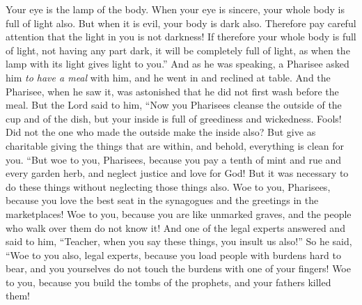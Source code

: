 \begin{biblechapter}
\verse Your eye is the lamp of the body. When your eye is sincere, your whole body is full of light also. But when it is evil, your body is dark also.
\verse Therefore pay careful attention that the light in you is not darkness!
\verse If therefore your whole body is full of light, not having any part dark, it will be completely full of light, as when the lamp with its light gives light to you.”
 And as he was speaking, a Pharisee asked him \textit{to have a meal} with him, and he went in and reclined at table.
\verse And the Pharisee, when he saw it, was astonished that he did not first wash before the meal.
\verse But the Lord said to him, “Now you Pharisees cleanse the outside of the cup and of the dish, but your inside is full of greediness and wickedness.
\verse Fools! Did not the one who made the outside make the inside also?
\verse But give as charitable giving the things that are within, and behold, everything is clean for you.
\verse “But woe to you, Pharisees, because you pay a tenth of mint and rue and every garden herb, and neglect justice and love for God! But it was necessary to do these things without neglecting those things also.
\verse Woe to you, Pharisees, because you love the best seat in the synagogues and the greetings in the marketplaces!
\verse Woe to you, because you are like unmarked graves, and the people who walk over them do not know it!
\verse And one of the legal experts answered and said to him, “Teacher, when you say these things, you insult us also!”
\verse So he said, “Woe to you also, legal experts, because you load people with burdens hard to bear, and you yourselves do not touch the burdens with one of your fingers!
\verse Woe to you, because you build the tombs of the prophets, and your fathers killed them!

\end{biblechapter}
